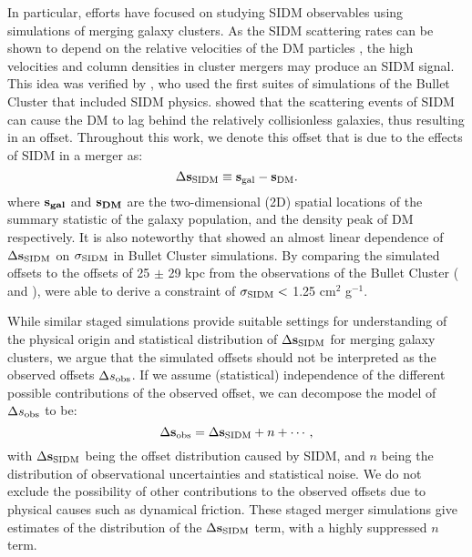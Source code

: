In particular, efforts have focused on studying SIDM observables 
using simulations of merging galaxy clusters.
As the SIDM scattering rates can be shown to depend on the 
relative velocities of the DM particles \citep{Markevitch2004}, the high
velocities and column densities 
in cluster mergers may produce an SIDM signal. This idea was verified by 
\cite{Randall2008d}, who used the first suites of simulations of the
Bullet Cluster that included SIDM physics. 
\cite{Randall2008d} showed that the scattering events of SIDM can cause the DM
to lag behind the relatively collisionless galaxies, thus resulting in an offset.
Throughout this work, we denote this offset that is due to the effects of SIDM
in a merger as:
\begin{equation}
	\Delta {\bf s}_{{\rm SIDM}} \equiv {\bf s}_{\rm gal} - {\bf s}_{\rm DM}.
	\label{eq:offset}
\end{equation}
where $\bf{s}_{gal}$ and $\bf{s}_{DM}$ are the two-dimensional (2D) spatial
locations of the summary statistic of the galaxy population, and the density
peak of DM respectively. 
It is also noteworthy that \cite{Randall2008d} showed an almost linear dependence of
$\Delta {\bf s}_{{\rm SIDM}}$ on $\sigma_{\rm SIDM}$ in Bullet Cluster simulations. 
By comparing the simulated offsets to the offsets of 25 $\pm$ 29 kpc from 
the observations of the Bullet Cluster
(\citealt{Markevitch2004} and \citealt{Bradac2006b}),
\cite{Randall2008d} were able to derive a constraint of $\sigma_{\rm SIDM} <$ 
1.25 cm$^2$ g$^{-1}$.  

While similar staged simulations provide suitable settings 
for understanding of the physical origin and statistical distribution of $\Delta {\bf s}_{{\rm SIDM}}$
for merging galaxy clusters, 
we argue that the simulated offsets should not be interpreted as the observed
offsets $\Delta s_{\rm obs}$.
If we assume (statistical) independence of 
the different possible contributions of the observed 
offset, we can decompose the model of $\Delta s_{\rm obs}$ to be:
\begin{equation}
	\Delta {\bf s}_{\rm obs} = \Delta {\bf s}_{{\rm SIDM}} + n + \cdots,
	\label{eq:signal_and_noise}
\end{equation}
with $\Delta {\bf s}_{{\rm SIDM}}$ being the offset distribution caused by SIDM, 
and $n$ being the distribution of observational uncertainties and statistical noise.
We do not exclude the possibility of other contributions to the observed
offsets due to physical causes such as dynamical friction.
These staged merger simulations give estimates of 
the distribution of the $\Delta {\bf s}_{{\rm SIDM}}$ term, with
a highly suppressed $n$ term. 
  
